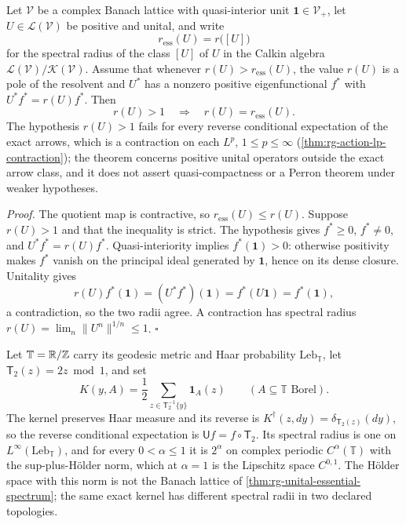 Let \(\mathcal V\) be a complex Banach lattice with quasi-interior unit
\(\mathbf1\in\mathcal V_+\), let \(U\in\mathcal L(\mathcal V)\) be positive and
unital, and write
\begin{equation}
r_{\mathrm{ess}}(U)=r\bigl([U]\bigr)
\label{eq:rg-calkin-essential-radius}
\end{equation}
for the spectral radius of the class \([U]\) of \(U\) in the Calkin algebra
\(\mathcal L(\mathcal V)/\mathcal K(\mathcal V)\). Assume that whenever
\(r(U)>r_{\mathrm{ess}}(U)\), the value \(r(U)\) is a pole of the resolvent and
\(U^*\) has a nonzero positive eigenfunctional \(f^*\) with
\(U^*f^*=r(U)f^*\). Then
\begin{equation}
r(U)>1\quad\Longrightarrow\quad r(U)=r_{\mathrm{ess}}(U).
\label{eq:rg-unital-essential-spectrum-result}
\end{equation}
The hypothesis \(r(U)>1\) fails for every reverse conditional expectation of
the exact arrows, which is a contraction on each \(L^p\),
\(1\leq p\leq\infty\) (\cref{thm:rg-action-lp-contraction}); the theorem
concerns positive unital operators outside the exact arrow class, and it does
not assert quasi-compactness or a Perron theorem under weaker hypotheses.

\noindent\emph{Proof.}
The quotient map is contractive, so \(r_{\mathrm{ess}}(U)\leq r(U)\). Suppose
\(r(U)>1\) and that the inequality is strict. The hypothesis gives
\(f^*\geq0\), \(f^*\neq0\), and \(U^*f^*=r(U)f^*\). Quasi-interiority implies
\(f^*(\mathbf1)>0\): otherwise positivity makes \(f^*\) vanish on the principal
ideal generated by \(\mathbf1\), hence on its dense closure. Unitality gives
\begin{equation}
r(U)f^*(\mathbf1)
=(U^*f^*)(\mathbf1)
=f^*(U\mathbf1)=f^*(\mathbf1),
\label{eq:rg-unital-functional-pairing}
\end{equation}
a contradiction, so the two radii agree. A contraction has spectral radius
\(r(U)=\lim_n\lVert U^n\rVert^{1/n}\leq1\). \(\square\)

Let \(\mathbb T=\mathbb R/\mathbb Z\) carry its geodesic metric and Haar probability
\(\mathrm{Leb}_{\mathbb T}\), let \(\mathsf T_2(z)=2z\bmod1\), and set
\begin{equation}
K(y,A)=\frac12\sum_{z\in\mathsf T_2^{-1}\{y\}}\mathbf1_A(z)
\qquad(A\subseteq\mathbb T\text{ Borel}).
\label{eq:rg-circle-forward-kernel}
\end{equation}
The kernel preserves Haar measure and its reverse is
\(K^\dagger(z,dy)=\delta_{\mathsf T_2(z)}(dy)\), so the reverse conditional
expectation is \(\mathsf Uf=f\circ\mathsf T_2\). Its spectral radius is one on
\(L^\infty(\mathrm{Leb}_{\mathbb T})\), and for every \(0<\alpha\leq1\) it is
\(2^\alpha\) on complex periodic \(C^\alpha(\mathbb T)\) with the
sup-plus-H\"older norm, which at \(\alpha=1\) is the Lipschitz space
\(C^{0,1}\). The H\"older space with this norm is not the Banach lattice of
\cref{thm:rg-unital-essential-spectrum}; the same exact kernel has different
spectral radii in two declared topologies. 

